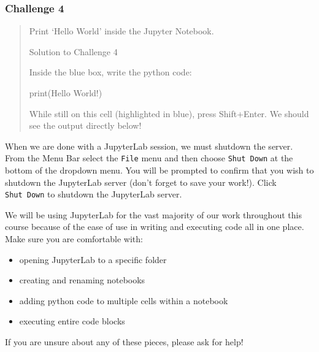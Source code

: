 \documentclass[
  letterpaper,
  DIV=11,
  numbers=noendperiod]{scrreprt}
\newenvironment{Shaded}{\begin{snugshade}}{\end{snugshade}}
\newcommand{\BuiltInTok}[1]{\textcolor[rgb]{0.00,0.23,0.31}{#1}}
\newcommand{\NormalTok}[1]{\textcolor[rgb]{0.00,0.23,0.31}{#1}}
\newcommand{\StringTok}[1]{\textcolor[rgb]{0.13,0.47,0.30}{#1}}
\providecommand{\tightlist}{%
  \setlength{\itemsep}{0pt}\setlength{\parskip}{0pt}}\usepackage{longtable,booktabs,array}
\begin{document}
\hypertarget{challenge-4}{%
\subsubsection{Challenge 4}\label{challenge-4}}

\begin{quote}
Print `Hello World' inside the Jupyter Notebook.

Solution to Challenge 4

Inside the blue box, write the python code:

\begin{Shaded}
\begin{Highlighting}[]
\BuiltInTok{print}\NormalTok{(}\StringTok{\textquotesingle{}Hello World!\textquotesingle{}}\NormalTok{)}
\end{Highlighting}
\end{Shaded}

While still on this cell (highlighted in blue), press Shift+Enter. We
should see the output directly below!
\end{quote}

When we are done with a JupyterLab session, we must shutdown the server.
From the Menu Bar select the \texttt{File} menu and then choose
\texttt{Shut\ Down} at the bottom of the dropdown menu. You will be
prompted to confirm that you wish to shutdown the JupyterLab server
(don't forget to save your work!). Click \texttt{Shut\ Down} to shutdown
the JupyterLab server.

\begin{tcolorbox}[enhanced jigsaw, colframe=quarto-callout-note-color-frame, toprule=.15mm, colback=white, leftrule=.75mm, rightrule=.15mm, breakable, colbacktitle=quarto-callout-note-color!10!white, arc=.35mm, bottomtitle=1mm, bottomrule=.15mm, titlerule=0mm, title=\textcolor{quarto-callout-note-color}{\faInfo}\hspace{0.5em}{JupyterLab and Us!}, toptitle=1mm, left=2mm, opacityback=0, coltitle=black, opacitybacktitle=0.6]
We will be using JupyterLab for the vast majority of our work throughout
this course because of the ease of use in writing and executing code all
in one place. Make sure you are comfortable with:

\begin{itemize}
\tightlist
\item
  opening JupyterLab to a specific folder
\item
  creating and renaming notebooks
\item
  adding python code to multiple cells within a notebook
\item
  executing entire code blocks
\end{itemize}

If you are unsure about any of these pieces, please ask for help!
\end{tcolorbox}
\end{document}
